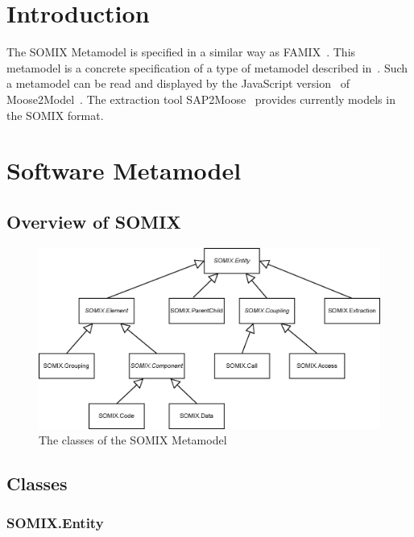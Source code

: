 \documentclass[preprint,12pt]{elsarticle}
\begin{document}

\section{Introduction}
\label{intro}
The SOMIX Metamodel is specified in a similar way as FAMIX~\cite{r_Ducasse_2011}.
This metamodel is a concrete specification of a type of metamodel described in~\cite{r_Metamodel_Preprint_2}.
Such a metamodel can be read and displayed by the JavaScript version~\cite{r_Moose2Model2} of Moose2Model~\cite{r_Moose2Model}. The extraction tool SAP2Moose~\cite{r_SAP2Moose} provides currently models in the SOMIX format.

\section{Software Metamodel}
\subsection{Overview of SOMIX}


\begin{figure} [h!] 
\centering

\includegraphics[width=1\columnwidth]{SOMIX_Classes.inkscape.eps} 
\caption{
The classes of the SOMIX Metamodel
}
\label{fig:InterfaceExample}   
\end{figure}
\subsection{Classes}

\subsubsection{SOMIX.Entity}
\end{document}
